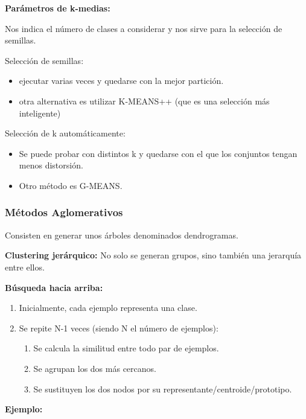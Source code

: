 \documentclass[12pt, twoside, openright]{report} %
\begin{document}
\textbf{Parámetros de k-medias:}

Nos indica el número de clases a considerar y nos sirve para la selección de semillas.

Selección de semillas:
\begin{itemize}
  \item ejecutar varias veces y quedarse con la mejor partición.
  \item otra alternativa es utilizar K-MEANS++ (que es una selección más inteligente)
\end{itemize}

Selección de k automáticamente:
\begin{itemize}
  \item Se puede probar con distintos k y quedarse con el que los conjuntos tengan menos distorsión.
  \item Otro método es G-MEANS.
\end{itemize}

\subsubsection{Métodos Aglomerativos}

Consisten en generar unos árboles denominados dendrogramas.

\textbf{Clustering jerárquico:} No solo se generan grupos, sino también una jerarquía entre ellos.

\textbf{Búsqueda hacia arriba:} 
\begin{enumerate}
  \item Inicialmente, cada ejemplo representa una clase.
  \item Se repite N-1 veces (siendo N el número de ejemplos):
  \begin{enumerate}
    \item Se calcula la similitud entre todo par de ejemplos.
    \item Se agrupan los dos más cercanos.
    \item Se sustituyen los dos nodos por su representante/centroide/prototipo.
  \end{enumerate}
\end{enumerate}

\textbf{Ejemplo:}
\end{document}
